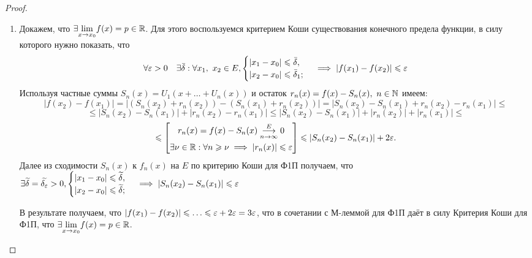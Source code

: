 \documentclass[../../main.tex]{subfiles}
\begin{document}
\begin{proof}
	\;
	
	\begin{enumerate}
		\item Докажем, что $\exists \underset{x \to x_0}{\lim} f(x) = 
	p \in \mathbb{R}$. Для этого воспользуемся критерием Коши существования 
	конечного предела функции, в силу которого нужно показать, что
	\begin{equation}
	\label{lec2:17}
	\forall \varepsilon > 0 \quad \exists \bar\delta :
	\forall x_1,\ x_2 \in E, 
	\begin{cases}
	|x_1 - x_0| \leqslant \bar\delta, \\
	|x_2 - x_0| \leqslant \bar\delta_1;
	\end{cases} \implies
	|f(x_1) - f(x_2)| \leqslant \varepsilon
	\end{equation}
	Используя частные суммы $S_n(x) = U_1(x + \ldots + U_n(x))$ и 
	остаток $r_n(x) = f(x) - S_n(x),\ n \in \mathbb{N}$ имеем:
	\[
	|f(x_2) - f(x_1)| = |(S_n(x_2) + r_n(x_2)) - (S_n(x_1) + r_n(x_2))| =
	|S_n(x_2) - S_n(x_1) + r_n(x_2) - r_n(x_1)| \leq 
	\]
	\[
	\leq |S_n(x_2) - S_n(x_1)| + |r_n(x_2) - r_n(x_1)| \leq 
	|S_n(x_2) - S_n(x_1)| + |r_n(x_2)| + |r_n(x_1)| \leq
	\]
	\[
	\leqslant 
	\left[
	\begin{gathered}
	r_n(x) = f(x) - S_n(x) \overset{E}
	{\underset{n \to \infty}\longrightarrow} 0 \\
	\exists \nu \in \mathbb{R} : \forall n \geqslant \nu \implies
	|r_n(x)| \leqslant \varepsilon
	\end{gathered}
	\right] \leqslant |S_n(x_2) - S_n(x_1)| + 2\varepsilon.
	\]
	Далее из сходимости $S_n(x)$ к $f_n(x)$ на $E$ по критерию Коши для Ф1П
	получаем, что $\exists \widetilde{\delta} = \widetilde{\delta_\varepsilon} > 0,
	\begin{cases} 
	|x_1 - x_0| \leqslant \widetilde{\delta}, \\
	|x_2 - x_0| \leqslant \widetilde{\delta};
	\end{cases} \implies
	|S_n(x_2) - S_n(x_1)| \leqslant \varepsilon$ 
	
	В результате получаем, что $|f(x_1) - f(x_2)| \leqslant \ldots \leqslant 
	\varepsilon + 2\varepsilon = 3\varepsilon$, что в сочетании с М-леммой для Ф1П даёт
	в силу Критерия Коши для Ф1П, что $\exists \underset{x \to x_0}{\lim}
	f(x) = p \in \mathbb{R}$.
	\end{enumerate}
\end{proof}
	
\end{document}
